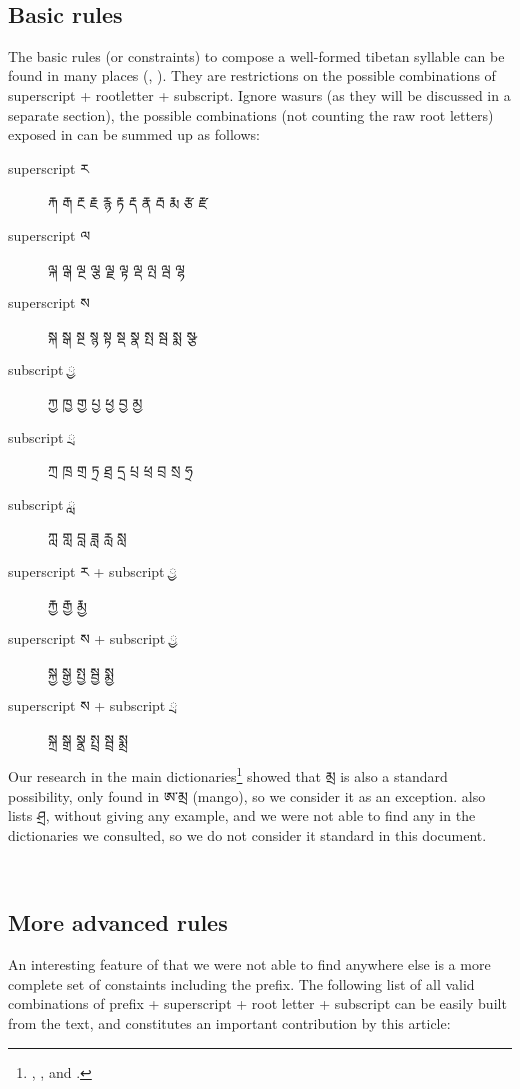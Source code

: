 \documentclass[%
a4paper,%
pagesize,%
12pt,%
parskip=off,%
bibliography=totoc,%
numbers=noenddot,%
DIV=12,%
twoside=semi,%
headings=normal%
]{scrartcl}
\begin{document}
­\subsection{Basic rules}

The basic rules (or constraints) to compose a well-formed tibetan syllable can be found in many places (\cite{TournadreMST}, \cite{TsheshabGrammarTopics}). They are restrictions on the possible combinations of superscript + rootletter + subscript. Ignore wasurs (as they will be discussed in a separate section), the possible combinations (not counting the raw root letters) exposed in \cite{TsheshabGrammarTopics} can be summed up as follows:\label{mainstackdecomposition}

\begin{description}
\item[superscript ར] རྐ རྒ རྔ རྗ རྙ རྟ རྡ རྣ རྦ རྨ རྩ རྫ
\item[superscript ལ] ལྐ ལྒ ལྔ ལྕ ལྗ ལྟ ལྡ ལྤ ལྦ ལྷ
\item[superscript ས] སྐ སྒ སྔ སྙ སྟ སྡ སྣ སྤ སྦ སྨ སྩ
\item[subscript ྱ] ཀྱ ཁྱ གྱ པྱ ཕྱ བྱ མྱ
\item[subscript ྲ] ཀྲ ཁྲ གྲ ཏྲ ཐྲ དྲ པྲ ཕྲ བྲ སྲ ཧྲ
\item[subscript ླ] ཀླ གླ བླ ཟླ རླ སླ
\item[superscript ར + subscript ྱ] རྐྱ རྒྱ རྨྱ
\item[superscript ས + subscript ྱ] སྐྱ སྒྱ སྤྱ སྦྱ སྨྱ
\item[superscript ས + subscript ྲ] སྐྲ སྒྲ སྣྲ སྤྲ སྦྲ སྨྲ
\end{description} 

Our research in the main dictionaries\footnote{\cite{DorjeDagyig}, \cite{YisunTsikchen}, \cite{MonlamGrandDict} and \cite{DungkarEncyclopedia}.} showed that མྲ is also a standard possibility, only found in ཨ་མྲ (mango), so we consider it as an exception. \cite{TournadreMST} also lists ཤྲ, without giving any example, and we were not able to find any in the dictionaries we consulted, so we do not consider it standard in this document.

­\subsection{More advanced rules}

An interesting feature of \cite{TsheshabGrammarTopics} that we were not able to find anywhere else is a more complete set of constaints including the prefix. The following list of all valid combinations of prefix + superscript + root letter + subscript can be easily built from the text, and constitutes an important contribution by this article:
\end{document}
